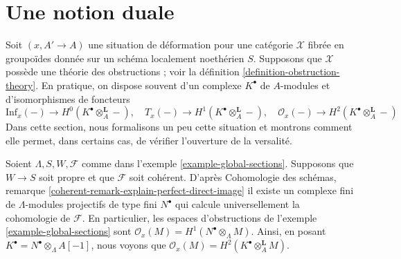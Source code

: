 \section{Une notion duale}
\label{section-dual}

\noindent
Soit $(x, A' \to A)$ une situation de déformation pour une catégorie
$\mathcal{X}$ fibrée en groupoïdes donnée sur un schéma localement noethérien
$S$. Supposons que $\mathcal{X}$ possède une théorie des obstructions ; voir la
définition \ref{definition-obstruction-theory}. En pratique, on dispose souvent
d'un complexe $K^\bullet$ de $A$-modules et d'isomorphismes de foncteurs
$$
\text{Inf}_x(-) \to H^0(K^\bullet \otimes_A^\mathbf{L} -),\quad
T_x(-) \to H^1(K^\bullet \otimes_A^\mathbf{L} -),\quad
\mathcal{O}_x(-) \to H^2(K^\bullet \otimes_A^\mathbf{L} -)
$$
Dans cette section, nous formalisons un peu cette situation et montrons comment
elle permet, dans certains cas, de vérifier l'ouverture de la versalité.

\begin{example}
\label{example-global-sections-dual}
Soient $\Lambda, S, W, \mathcal{F}$ comme dans l'exemple
\ref{example-global-sections}. Supposons que $W \to S$ soit propre et que
$\mathcal{F}$ soit cohérent. D'après Cohomologie des schémas, remarque
\ref{coherent-remark-explain-perfect-direct-image}
il existe un complexe fini de $\Lambda$-modules projectifs de type fini
$N^\bullet$ qui calcule universellement la cohomologie de $\mathcal{F}$. En particulier,
les espaces d'obstructions de l'exemple \ref{example-global-sections} sont
$\mathcal{O}_x(M) = H^1(N^\bullet \otimes_\Lambda M)$. Ainsi, en posant
$K^\bullet = N^\bullet \otimes_\Lambda A[-1]$, nous voyons que
$\mathcal{O}_x(M) = H^2(K^\bullet \otimes_A^\mathbf{L} M)$.
\end{example}

